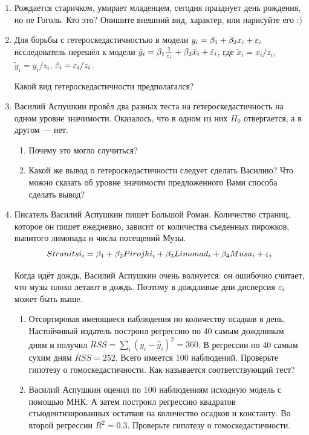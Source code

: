 \documentclass[12pt, a4paper]{article}
\begin{document}
\begin{enumerate}

\item Рождается старичком, умирает младенцем, сегодня празднует день рождения, но не Гоголь.
Кто это? Опишите внешний вид, характер, или нарисуйте его :)

\item Для борьбы с гетероскедастичностью в модели $y_i=\beta_1+\beta_2 x_i+\varepsilon_i$ исследователь перешёл к модели $\tilde{y}_i=\beta_1 \frac{1}{z_i}+\beta_2 \tilde{x}_i+\tilde{\varepsilon}_i$, где $\tilde{x}_i=x_i/z_i$, $\tilde{y}_i=y_i/z_i$, $\tilde{\varepsilon}_i=\varepsilon_i/z_i$.

Какой вид гетероскедастичности предполагался?

\item Василий Аспушкин провёл два разных теста на гетероскедастичность на одном уровне значимости. Оказалось, что в одном из них $H_0$ отвергается, а в другом — нет.
\begin{enumerate}
\item Почему это могло случиться?
\item Какой же вывод о гетероскедастичности следует сделать Василию? Что можно сказать об уровне значимости предложенного Вами способа сделать вывод?

\end{enumerate}


\item Писатель Василий Аспушкин пишет Большой Роман. Количество страниц, которое он пишет ежедневно, зависит от количества съеденных пирожков, выпитого лимонада и числа посещений Музы.
\[
Stranitsi_i = \beta_1 + \beta_2 Pirojki_i + \beta_3 Limonad_i + \beta_4 Musa_i + \varepsilon_i
\]

Когда идёт дождь, Василий Аспушкин очень волнуется: он ошибочно считает, что музы плохо летают в дождь. Поэтому в дождливые дни дисперсия $\varepsilon_i$ может быть выше.


\begin{enumerate}
\item Отсортировав имеющиеся наблюдения по количеству осадков в день, Настойчивый издатель построил регрессию по 40 самым дождливым дням и получил $RSS=\sum_i (y_i-\hat{y}_i)^2=360$. В регрессии по 40 самым сухим дням $RSS=252$. Всего имеется 100 наблюдений. Проверьте гипотезу о гомоскедастичности. Как называется соответствующий тест?

\item Василий Аспушкин оценил по 100 наблюдениям исходную модель с помощью МНК. А затем построил регрессию квадратов стьюдентизированных остатков на количество осадков и константу. Во второй регрессии $R^2=0.3$. Проверьте гипотезу о гомоскедастичности.


\end{enumerate}
\end{enumerate}
\end{document}
